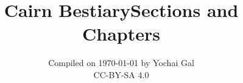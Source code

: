 \documentclass[
  10pt,
  american,
]{extbook}
\title{Cairn Bestiary}
\subtitle{Compiled on {\today} by Yochai Gal \\ CC-BY-SA 4.0}
\date{}
\begin{document}
\maketitle
\thispagestyle{empty}
\AtBeginShipoutNext{\AtBeginShipoutDiscard}
\let\oldtoc\tableofcontents
\renewcommand{\contentsname}{\centering Contents}
\title{Sections and Chapters}
\renewcommand{\tableofcontents}{\oldtoc\newpage}
{
\pagestyle{empty}
\begin{multicols}{2}
\tableofcontents
\end{multicols}
}
\clearpage
{} 
\setcounter{page}{5} 

\end{document}
